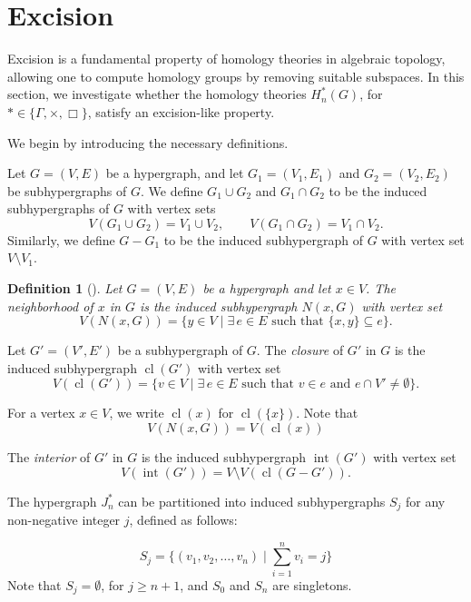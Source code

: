 \documentclass[11pt]{amsart}
\newtheorem{Def}[subsection]{Definition}
\newcommand{\cl}{\operatorname{cl}}
\renewcommand{\int}{\operatorname{int}}
\begin{document}
\section{Excision}\label{sec:excision}

Excision is a fundamental property of homology theories in algebraic topology, allowing one to compute homology groups by removing suitable subspaces. In this section, we investigate whether the homology theories $H_n^*(G)$, for $* \in \{\Gamma, \times, \Box\}$, satisfy an excision-like property.

We begin by introducing the necessary definitions.

Let $G = (V,E)$ be a hypergraph, and let $G_1 = (V_1,E_1)$ and $G_2 = (V_2,E_2)$ be subhypergraphs of $G$. We define $G_1 \cup G_2$ and $G_1 \cap G_2$ to be the induced subhypergraphs of $G$ with vertex sets
\[
V(G_1 \cup G_2) = V_1 \cup V_2, \qquad V(G_1 \cap G_2) = V_1 \cap V_2.
\]
Similarly, we define $G - G_1$ to be the induced subhypergraph of $G$ with vertex set $V \setminus V_1$.

\medskip

\begin{Def}[{\cite{HG_Bretto}}]\label{def:neighborhood}
Let $G = (V,E)$ be a hypergraph and let $x \in V$. The \emph{neighborhood} of $x$ in $G$ is the induced subhypergraph $N(x,G)$ with vertex set
\[
V(N(x,G)) = \{ y \in V \mid \exists\, e \in E \text{ such that } \{x,y\} \subseteq e \}.
\]
\end{Def}

\medskip

Let $G' = (V',E')$ be a subhypergraph of $G$. The \emph{closure} of $G'$ in $G$ is the induced subhypergraph $\cl(G')$ with vertex set
\[
V(\cl(G')) = \{ v \in V \mid \exists\, e \in E \text{ such that } v \in e \text{ and } e \cap V' \neq \emptyset \}.
\]

For a vertex $x \in V$, we write $\cl(x)$ for $\cl(\{x\})$. Note that
\[
V(N(x,G)) = V(\cl(x))
\]

\medskip

The \emph{interior} of $G'$ in $G$ is the induced subhypergraph $\int(G')$ with vertex set
\[
V(\int(G')) = V \setminus V(\cl(G - G')).
\]

\medskip

The hypergraph $J_n^*$ can be partitioned into induced subhypergraphs $S_j$ for any non-negative integer $j$, defined as follows:

\[
S_j = \{ (v_1, v_2, \ldots, v_n) \mid \sum_{i=1}^n v_i = j \}
\]
Note that $S_j=\emptyset$, for $j\geq n+1$, and
$S_0$ and $S_n$ are singletons.
\end{document}
